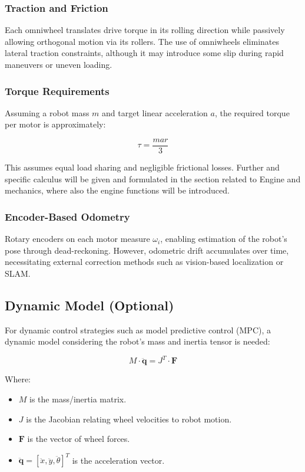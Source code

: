 \documentclass{article}
\begin{document}
\subsubsection{Traction and Friction}

Each omniwheel translates drive torque in its rolling direction while passively allowing orthogonal motion via its rollers. The use of omniwheels eliminates lateral traction constraints, although it may introduce some slip during rapid maneuvers or uneven loading.

\subsubsection{Torque Requirements}

Assuming a robot mass $m$ and target linear acceleration $a$, the required torque per motor is approximately:

\[
\tau = \frac{m a r}{3}
\]

This assumes equal load sharing and negligible frictional losses. Further and specific calculus will be given and formulated in the section related to Engine and mechanics, where also the engine functions will be introduced.

\subsubsection{Encoder-Based Odometry}

Rotary encoders on each motor measure $\omega_i$, enabling estimation of the robot’s pose through dead-reckoning. However, odometric drift accumulates over time, necessitating external correction methods such as vision-based localization or SLAM.

\subsection{Dynamic Model (Optional)}

For dynamic control strategies such as model predictive control (MPC), a dynamic model considering the robot's mass and inertia tensor is needed:

\[
M \cdot \ddot{\mathbf{q}} = J^T \cdot \mathbf{F}
\]

Where:
\begin{itemize}
    \item $M$ is the mass/inertia matrix.
    \item $J$ is the Jacobian relating wheel velocities to robot motion.
    \item $\mathbf{F}$ is the vector of wheel forces.
    \item $\ddot{\mathbf{q}} = [\ddot{x}, \ddot{y}, \ddot{\theta}]^T$ is the acceleration vector.
\end{itemize}
\end{document}
